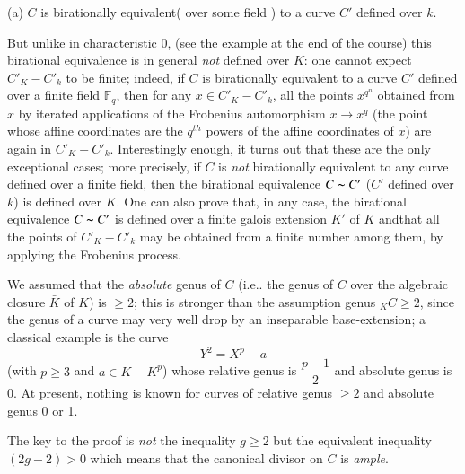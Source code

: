 (a) $C$ is birationally equivalent( over some field ) to a curve $C'$
defined over $k$. 
 
But unlike in characteristic $0$, (see the example at the end of the
course) this birational equivalence is in general \textit{not} defined
over $K$: one cannot expect $C'_K - C'_k$ to be finite; indeed, if $C$
is birationally equivalent to a curve $C'$ defined over a finite field
$\mathbb{F}_q$, then for any $x \in  C'_K-C'_k$, all the points
$x^{q^n}$ obtained from $x$ by iterated applications of the Frobenius
automorphism $x \to x^q$ (the point whose affine coordinates are the
$q^{th}$ powers of the affine coordinates of $x$) are again in $C'_K -
C'_k$. Interestingly enough, it turns out that these are the only
exceptional cases; more precisely, if $C$ is \textit{ not }
birationally equivalent to any curve defined over a finite field, then
the birational equivalence $C \thicksim C'$ ($C'$ defined over $k$) is
defined over $K$. One can also prove that, in any case, the birational
equivalence $C \thicksim C'$ is defined over a finite galois extension
$K'$ of $K$ and\pageoriginale that all the points of $C'_K - C'_k$ may be obtained
from a finite number among them, by applying the Frobenius process. 
 
We assumed that the \textit{absolute} genus of $C$ (i.e.. the genus of $C$
over the algebraic closure $\bar{K}$ of $K$) is $\geq 2$; this is
stronger than the assumption genus $_K C \geq 2$, since the genus of a
curve may very well drop by an inseparable base-extension; a classical
example is the curve  
$$ 
Y^2 = X^p - a 
$$
(with $p \geq 3$ and $a \in K-K^p$) whose relative genus is
$\dfrac{p-1}{2}$ and absolute genus is 0. At present, nothing is
known for curves of relative genus $\geq 2$ and absolute genus $0$ or
1. 

The key to the proof is \textit{ not } the inequality $g \geq 2$ but
the equivalent inequality $(2g-2) > 0$ which means that the canonical
divisor on $C$ is \textit{ample}. 

